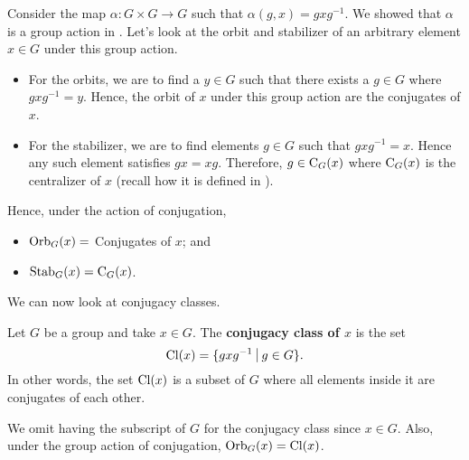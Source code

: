 Consider the map $\alpha: G\times G\to G$ such that $\alpha(g, x) = gxg^{-1}$. We showed that $\alpha$ is a group action in . Let's look at the orbit and stabilizer of an arbitrary element $x \in G$ under this group action.
\begin{itemize}
    \item For the orbits, we are to find a $y \in G$ such that there exists a $g \in G$ where $gxg^{-1} = y$. Hence, the orbit of $x$ under this group action are the conjugates of $x$.
    \item For the stabilizer, we are to find elements $g \in G$ such that $gxg^{-1} = x$. Hence any such element satisfies $gx = xg$. Therefore, $g \in \mathrm{C}_{G}(x)$ where $\mathrm{C}_{G}(x)$ is the centralizer of $x$ (recall how it is defined in ).
\end{itemize}

Hence, under the action of conjugation,
\begin{itemize}
    \item $\mathrm{Orb}_{G}(x) = $ Conjugates of $x$; and
    \item $\mathrm{Stab}_{G}(x) = \mathrm{C}_{G}(x)$.
\end{itemize}

\newpage

We can now look at conjugacy classes.
\begin{definition}
    Let $G$ be a group and take $x \in G$. The \textbf{conjugacy class of $x$} is the set
    \[
        \Cl{x} = \{gxg^{-1} \vert g \in G\}.
    \]
    In other words, the set $\mathrm{Cl}(x)$ is a subset of $G$ where all elements inside it are conjugates of each other.
\end{definition}
\begin{remark}
    We omit having the subscript of $G$ for the conjugacy class since $x \in G$. Also, under the group action of conjugation, $\mathrm{Orb}_{G}(x) = \mathrm{Cl}(x)$.
\end{remark}

